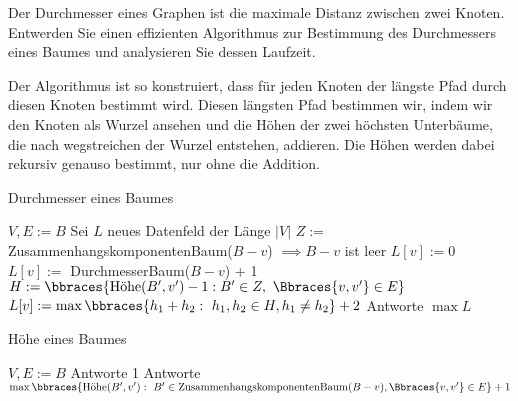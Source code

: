 
\begin{exercise}

Der Durchmesser eines Graphen ist die maximale Distanz zwischen zwei Knoten.
Entwerden Sie einen effizienten Algorithmus zur Bestimmung des Durchmessers
eines Baumes und analysieren Sie dessen Laufzeit.

\end{exercise}


\begin{solution}

Der Algorithmus ist so konstruiert, dass für jeden Knoten der längste Pfad durch diesen Knoten bestimmt wird. Diesen längsten Pfad bestimmen wir, indem wir den Knoten als Wurzel ansehen und die Höhen der zwei höchsten Unterbäume, die nach wegstreichen der Wurzel entstehen, addieren. Die Höhen werden dabei rekursiv genauso bestimmt, nur ohne die Addition. \pagebreak

\begin{algorithm}
  \caption{Durchmesser eines Baumes}
  \begin{algorithmic}[1]
    \State $V, E := B$
    \State Sei $L$ neues Datenfeld der Länge $|V|$
    \State $Z :=$ ZusammenhangskomponentenBaum($B-v$)
     $\implies B-v$ ist leer
    \State $L[v] := 0$
    \EndIf
    \State $L[v] :=$ DurchmesserBaum($B-v$) + 1
    \EndIf
    \State $H := \bbraces{\text{Höhe}(B^\prime, v^\prime) - 1: B^\prime \in Z,~ \Bbraces{v,v^\prime} \in E}$
    \State $L[v] := \max \bbraces{h_1 + h_2:~ h_1,h_2 \in H, h_1 \neq h_2} + 2$
    \EndIf
    \EndFor
    \State Antworte $\max L$
    \EndProcedure
  \end{algorithmic}
\end{algorithm}

\begin{algorithm}
  \caption{Höhe eines Baumes}
  \begin{algorithmic}[1]
    \State $V, E := B$
    \State Antworte 1
    \EndIf
    \State Antworte $\max \bbraces{\text{Höhe}(B^\prime, v^\prime):~ B^\prime \in \text{ZusammenhangskomponentenBaum}(B-v), \Bbraces{v, v^\prime} \in E} + 1$
    \EndIf
    \EndProcedure
  \end{algorithmic}
\end{algorithm}



\end{solution}
